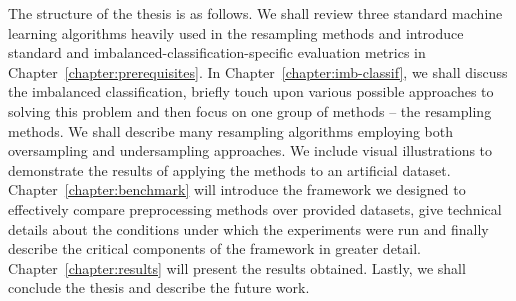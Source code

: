 The structure of the thesis is as follows. We shall review three standard machine learning
algorithms heavily used in the resampling methods and introduce standard and
imbalanced-classification-specific evaluation metrics in Chapter~\ref{chapter:prerequisites}. In
Chapter~\ref{chapter:imb-classif}, we shall discuss the imbalanced classification, briefly touch
upon various possible approaches to solving this problem and then focus on one group of methods –
the resampling methods. We shall describe many resampling algorithms employing both oversampling
and undersampling approaches. We include visual illustrations to demonstrate the results of
applying the methods to an artificial dataset. Chapter~\ref{chapter:benchmark} will introduce the
framework we designed to effectively compare preprocessing methods over provided datasets, give
technical details about the conditions under which the experiments were run and finally describe
the critical components of the framework in greater detail. Chapter~\ref{chapter:results} will
present the results obtained. Lastly, we shall conclude the thesis and describe the future work.
